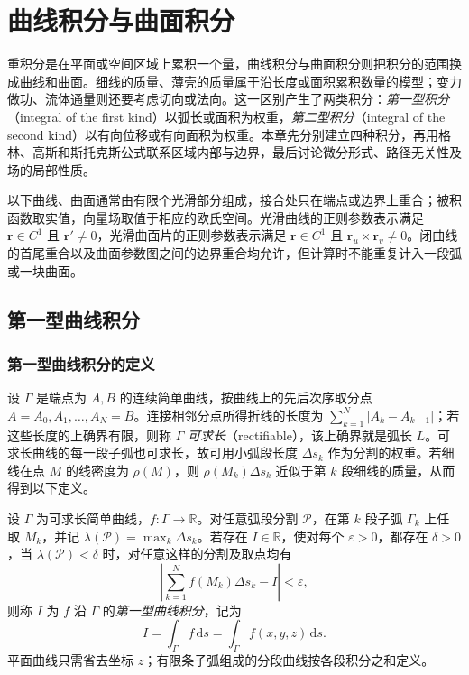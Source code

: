 \setcounter{chapter}{15} %
\chapter{曲线积分与曲面积分}
\label{chap:line-and-surface-integrals}

重积分是在平面或空间区域上累积一个量，曲线积分与曲面积分则把积分的范围换成曲线和曲面。细线的质量、薄壳的质量属于沿长度或面积累积数量的模型；变力做功、流体通量则还要考虑切向或法向。这一区别产生了两类积分：\emph{第一型积分}（integral of the first kind）以弧长或面积为权重，\emph{第二型积分}（integral of the second kind）以有向位移或有向面积为权重。本章先分别建立四种积分，再用格林、高斯和斯托克斯公式联系区域内部与边界，最后讨论微分形式、路径无关性及场的局部性质。

以下曲线、曲面通常由有限个光滑部分组成，接合处只在端点或边界上重合；被积函数取实值，向量场取值于相应的欧氏空间。光滑曲线的正则参数表示满足 $\boldsymbol r\in C^1$ 且 $\boldsymbol r'\neq0$，光滑曲面片的正则参数表示满足 $\boldsymbol r\in C^1$ 且 $\boldsymbol r_u\times\boldsymbol r_v\neq0$。闭曲线的首尾重合以及曲面参数图之间的边界重合均允许，但计算时不能重复计入一段弧或一块曲面。

\section{第一型曲线积分}
\label{sec:line-integrals-of-the-first-kind}

\subsection{第一型曲线积分的定义}
\label{subsec:definition-of-line-integrals-of-the-first-kind}

设 $\Gamma$ 是端点为 $A,B$ 的连续简单曲线，按曲线上的先后次序取分点 $A=A_0,A_1,\ldots,A_N=B$。连接相邻分点所得折线的长度为 $\sum_{k=1}^N|A_k-A_{k-1}|$；若这些长度的上确界有限，则称 $\Gamma$ \emph{可求长}（rectifiable），该上确界就是弧长 $L$。可求长曲线的每一段子弧也可求长，故可用小弧段长度 $\Delta s_k$ 作为分割的权重。若细线在点 $M$ 的线密度为 $\rho(M)$，则 $\rho(M_k)\Delta s_k$ 近似于第 $k$ 段细线的质量，从而得到以下定义。

\begin{definition}
\label{def:line-integral-first-kind}
设 $\Gamma$ 为可求长简单曲线，$f:\Gamma\to\mathbb R$。对任意弧段分割 $\mathcal P$，在第 $k$ 段子弧 $\Gamma_k$ 上任取 $M_k$，并记 $\lambda(\mathcal P)=\max_k\Delta s_k$。若存在 $I\in\mathbb R$，使对每个 $\varepsilon>0$，都存在 $\delta>0$，当 $\lambda(\mathcal P)<\delta$ 时，对任意这样的分割及取点均有
\[
    \left|\sum_{k=1}^N f(M_k)\Delta s_k-I\right|<\varepsilon,
\]
则称 $I$ 为 $f$ 沿 $\Gamma$ 的\emph{第一型曲线积分}，记为
\[
    I=\int_\Gamma f\,\mathrm ds
      =\int_\Gamma f(x,y,z)\,\mathrm ds.
\]
平面曲线只需省去坐标 $z$；有限条子弧组成的分段曲线按各段积分之和定义。
\end{definition}

